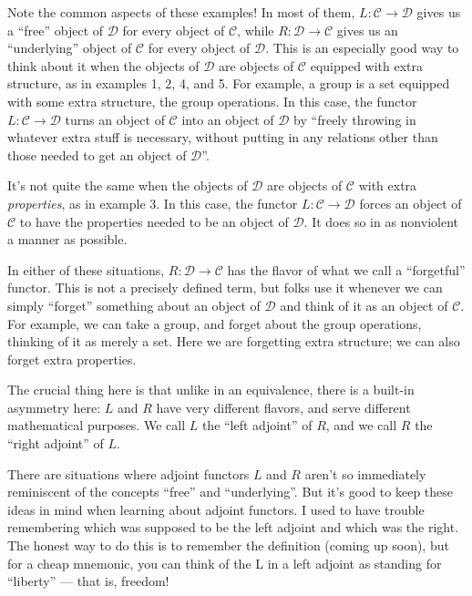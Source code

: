 \documentclass{article}
\begin{document}
Note the common aspects of these examples! In most of them,
\(L\colon\mathcal{C} \to \mathcal{D}\) gives us a ``free'' object of
\(\mathcal{D}\) for every object of \(\mathcal{C}\), while
\(R\colon\mathcal{D}\to\mathcal{C}\) gives us an ``underlying'' object
of \(\mathcal{C}\) for every object of \(\mathcal{D}\). This is an
especially good way to think about it when the objects of
\(\mathcal{D}\) are objects of \(\mathcal{C}\) equipped with extra
structure, as in examples 1, 2, 4, and 5. For example, a group is a set
equipped with some extra structure, the group operations. In this case,
the functor \(L\colon\mathcal{C}\to\mathcal{D}\) turns an object of
\(\mathcal{C}\) into an object of \(\mathcal{D}\) by ``freely throwing
in whatever extra stuff is necessary, without putting in any relations
other than those needed to get an object of \(\mathcal{D}\)''.

It's not quite the same when the objects of \(\mathcal{D}\) are objects
of \(\mathcal{C}\) with extra \emph{properties}, as in example 3. In
this case, the functor \(L\colon\mathcal{C}\to\mathcal{D}\) forces an
object of \(\mathcal{C}\) to have the properties needed to be an object
of \(\mathcal{D}\). It does so in as nonviolent a manner as possible.

In either of these situations, \(R\colon\mathcal{D}\to\mathcal{C}\) has
the flavor of what we call a ``forgetful'' functor. This is not a
precisely defined term, but folks use it whenever we can simply
``forget'' something about an object of \(\mathcal{D}\) and think of it
as an object of \(\mathcal{C}\). For example, we can take a group, and
forget about the group operations, thinking of it as merely a set. Here
we are forgetting extra structure; we can also forget extra properties.

The crucial thing here is that unlike in an equivalence, there is a
built-in asymmetry here: \(L\) and \(R\) have very different flavors,
and serve different mathematical purposes. We call \(L\) the ``left
adjoint'' of \(R\), and we call \(R\) the ``right adjoint'' of \(L\).

There are situations where adjoint functors \(L\) and \(R\) aren't so
immediately reminiscent of the concepts ``free'' and ``underlying''. But
it's good to keep these ideas in mind when learning about adjoint
functors. I used to have trouble remembering which was supposed to be
the left adjoint and which was the right. The honest way to do this is
to remember the definition (coming up soon), but for a cheap mnemonic,
you can think of the L in a left adjoint as standing for ``liberty'' ---
that is, freedom!
\end{document}

